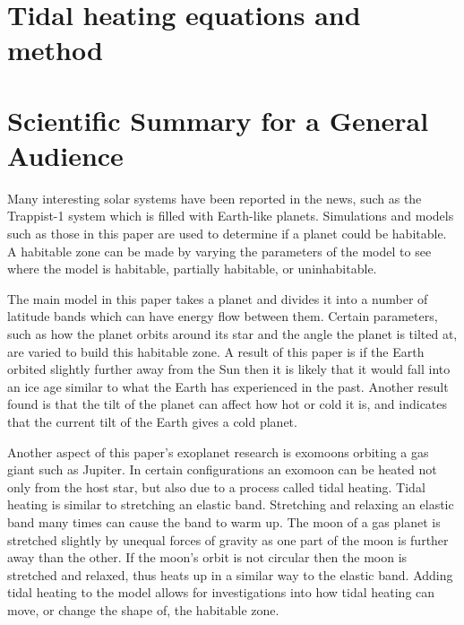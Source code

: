 \documentclass[12pt, onecolumn]{revtex4-2}    %
\begin{document}
\section{Tidal heating equations and method} \label{appx:TidalHeatingEquationsMethod}

\clearpage

\section*{Scientific Summary for a General Audience}

Many interesting solar systems have been reported in the news, such as the Trappist-1 system which is filled with Earth-like planets.
Simulations and models such as those in this paper are used to determine if a planet could be habitable.
A habitable zone can be made by varying the parameters of the model to see where the model is habitable, partially habitable, or uninhabitable.

The main model in this paper takes a planet and divides it into a number of latitude bands which can have energy flow between them.
Certain parameters, such as how the planet orbits around its star and the angle the planet is tilted at, are varied to build this habitable zone.
A result of this paper is if the Earth orbited slightly further away from the Sun then it is likely that it would fall into an ice age similar to what the Earth has experienced in the past.
Another result found is that the tilt of the planet can affect how hot or cold it is, and indicates that the current tilt of the Earth gives a cold planet.

Another aspect of this paper's exoplanet research is exomoons orbiting a gas giant such as Jupiter.
In certain configurations an exomoon can be heated not only from the host star, but also due to a process called tidal heating.
Tidal heating is similar to stretching an elastic band.
Stretching and relaxing an elastic band many times can cause the band to warm up.
The moon of a gas planet is stretched slightly by unequal forces of gravity as one part of the moon is further away than the other.
If the moon's orbit is not circular then the moon is stretched and relaxed, thus heats up in a similar way to the elastic band.
Adding tidal heating to the model allows for investigations into how tidal heating can move, or change the shape of, the habitable zone.
\end{document}
